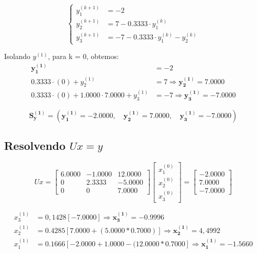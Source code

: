 \documentclass[12pt,a4paper]{article}
\begin{document}
\begin{equation*}
\left\{
\begin{aligned}
y_1^{(k+1)} &= -2 \\
y_2^{(k+1)} &= 7 - 0.3333 \cdot y_1^{(k)} \\
y_3^{(k+1)} &= -7 - 0.3333 \cdot y_1^{(k)} - y_2^{(k)}
\end{aligned}
\right.
\end{equation*}

\vspace{0,3 cm}

Isolando $y^{(1)}$, para k = 0, obtemos:
\begin{align*}
\boldsymbol{y_1^{(1)}} &= -2 \\
0.3333 \cdot (0) + y_2^{(1)} &= 7 \Rightarrow \boldsymbol{y_2^{(1)}} = 7.0000 \\
0.3333 \cdot (0) + 1.0000 \cdot 7.0000 + y_3^{(1)} &= -7 \Rightarrow \boldsymbol{y_3^{(1)}} = -7.0000
\end{align*}

\[
\boldsymbol{S_y^{(1)}} =
(
\boldsymbol{y_1^{(1)}} = -2.0000,\quad
\boldsymbol{y_2^{(1)}} = 7.0000,\quad
\boldsymbol{y_3^{(1)}} = -7.0000
)
\]

\subsection{Resolvendo $Ux = y$}

\[
Ux =
\begin{bmatrix}
6.0000 & -1.0000 & 12.0000 \\
0      & 2.3333  & -5.0000 \\
0      & 0       & 7.0000
\end{bmatrix}
\begin{bmatrix}
x_1^{(0)} \\
x_2^{(0)} \\
x_3^{(0)}
\end{bmatrix}
=
\begin{bmatrix}
-2.0000 \\
7.0000 \\
-7.0000
\end{bmatrix}
\]

\begin{align*}
x_3^{(1)} &= 0,1428[- 7.0000]\Rightarrow \boldsymbol{x_3^{(1)}} = - 0.9996 \\
x_2^{(1)} &= 0.4285[7.0000 + (5.0000 * 0.7000)] \Rightarrow \boldsymbol{x_2^{(1)}} = 4,4992 \\
x_1^{(1)} &= 0.1666[-2.0000 + 1.0000 - (12.0000 * 0.7000] \Rightarrow \boldsymbol{x_1^{(1)}} = -1.5660
\end{align*}
\end{document}
